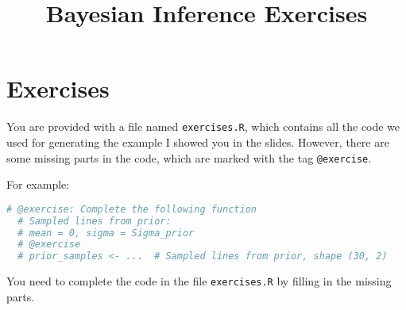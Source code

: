 \documentclass{article}
\title{Bayesian Inference Exercises}
\author{}
\date{}
\begin{document}
\maketitle

\section*{Exercises}
You are provided with a file named \texttt{exercises.R},
which contains all the code we used for generating the example I showed you in the slides.
However, there are some missing parts in the code,
which are marked with the tag  \texttt{@exercise}.

For example:
\begin{lstlisting}[language=R, caption={Example of an exercise in the code}]
  # @exercise: Complete the following function
  # Sampled lines from prior:
  # mean = 0, sigma = Sigma_prior
  # @exercise
  # prior_samples <- ...  # Sampled lines from prior, shape (30, 2)
\end{lstlisting}
You need to complete the code in the file \texttt{exercises.R} by filling in the missing parts.
\end{document}
